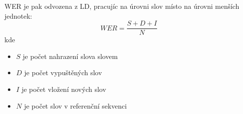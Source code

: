 WER je pak odvozena z LD, pracujíc na úrovni slov místo na úrovni menších jednotek:
%
\begin{equation}
	\label{eq:wer}
	WER = \frac{S+D+I}{N}
\end{equation}
%
kde
%
\begin{itemize}
\item $S$ je počet nahrazení slova slovem
\item $D$ je počet vypuštěných slov
\item $I$ je počet vložení nových slov
\item $N$ je počet slov v referenční sekvenci
\end{itemize}